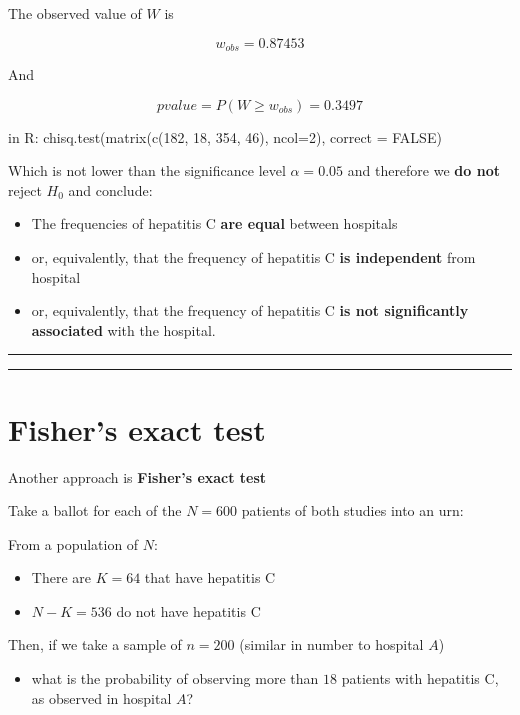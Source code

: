 \documentclass[
]{book}
\providecommand{\tightlist}{%
  \setlength{\itemsep}{0pt}\setlength{\parskip}{0pt}}
\begin{document}
The observed value of \(W\) is

\[w_{obs}= 0.87453\]

And

\[pvalue=P(W \geq w_{obs}) =0.3497\]

in R: chisq.test(matrix(c(182, 18, 354, 46), ncol=2), correct = FALSE)

Which is not lower than the significance level \(\alpha=0.05\) and therefore we \textbf{do not} reject \(H_0\) and conclude:

\begin{itemize}
\item
  The frequencies of hepatitis C \textbf{are equal} between hospitals
\item
  or, equivalently, that the frequency of hepatitis C \textbf{is independent} from hospital
\item
  or, equivalently, that the frequency of hepatitis C \textbf{is not significantly associated} with the hospital.
\end{itemize}

\begin{center}\rule{0.5\linewidth}{0.5pt}\end{center}

\begin{center}\rule{0.5\linewidth}{0.5pt}\end{center}

\hypertarget{fishers-exact-test}{%
\section{Fisher's exact test}\label{fishers-exact-test}}

Another approach is \textbf{Fisher's exact test}

Take a ballot for each of the \(N=600\) patients of both studies into an urn:

From a population of \(N\):

\begin{itemize}
\tightlist
\item
  There are \(K=64\) that have hepatitis C
\item
  \(N-K=536\) do not have hepatitis C
\end{itemize}

Then, if we take a sample of \(n=200\) (similar in number to hospital \(A\))

\begin{itemize}
\tightlist
\item
  what is the probability of observing more than \(18\) patients with hepatitis C, as observed in hospital \(A\)?
\end{itemize}
\end{document}
